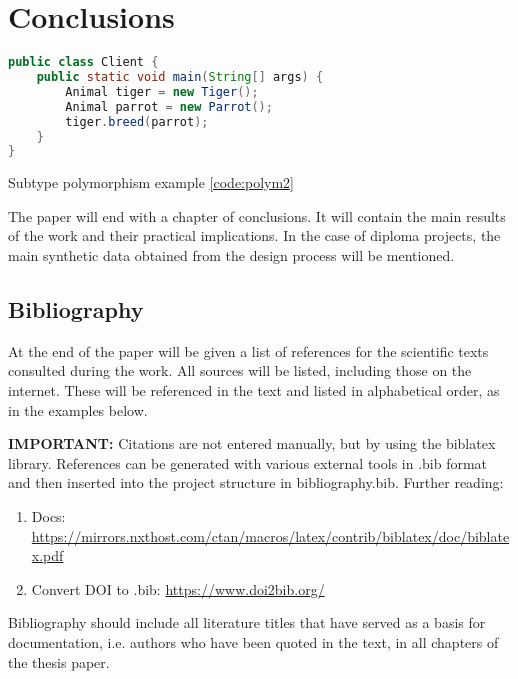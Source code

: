 \chapter{Conclusions}
\thispagestyle{pagestyle}

\begin{code}
	\begin{lstlisting}[language=Java]
public class Client {
	public static void main(String[] args) {
		Animal tiger = new Tiger();
		Animal parrot = new Parrot();
		tiger.breed(parrot);
	}
}
	\end{lstlisting}
	\caption{Subtype polymorphism example \cref{code:polym2}}
	\label{code:polym3}
\end{code}

The paper will end with a chapter of conclusions. It will contain the main results of the work and their practical implications. In the case of diploma projects, the main synthetic data obtained from the design process will be mentioned.

\section{Bibliography}
At the end of the paper will be given a list of references for the scientific texts consulted during the work. All sources will be listed, including those on the internet. These will be referenced in the text and listed in alphabetical order, as in the examples below.

\textbf{IMPORTANT:} Citations are not entered manually, but by using the biblatex library. References can be generated with various external tools in .bib format and then inserted into the project structure in bibliography.bib. Further reading:
\begin{enumerate}
    \item Docs: \url{https://mirrors.nxthost.com/ctan/macros/latex/contrib/biblatex/doc/biblatex.pdf}
    \item Convert DOI to .bib: \url{https://www.doi2bib.org/}
\end{enumerate}


Bibliography should include all literature titles that have served as a basis for documentation, i.e. authors who have been quoted in the text, in all chapters of the thesis paper. 

